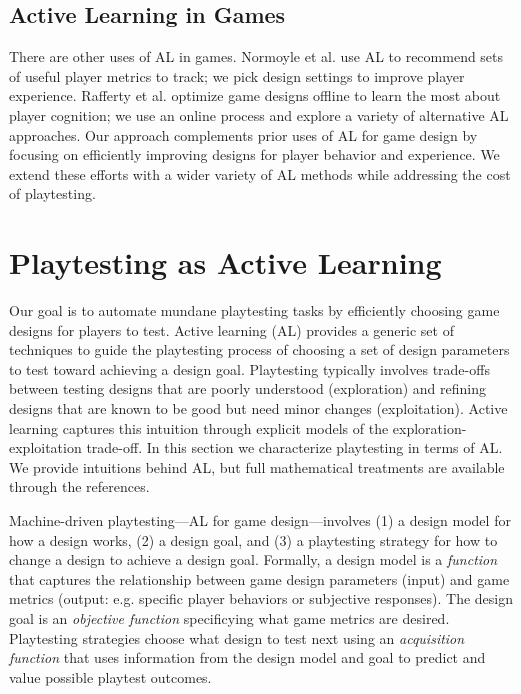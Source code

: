 \documentclass{sig-alternate}
\begin{document}
\subsection{Active Learning in Games}

There are other uses of AL in games.
Normoyle et al. \cite{normoyle2012:al-metrics} use AL to recommend sets of useful player metrics to track; we pick design settings to improve player experience.
Rafferty et al. \cite{rafferty2012:opt-cog-game} optimize game designs offline to learn the most about player cognition; we use an online process and explore a variety of alternative AL approaches.
Our approach complements prior uses of AL for game design by focusing on efficiently improving designs for player behavior and experience.
We extend these efforts with a wider variety of AL methods while addressing the cost of playtesting.



\section{Playtesting as Active Learning}

Our goal is to automate mundane playtesting tasks by efficiently choosing game designs for players to test.
Active learning (AL) provides a generic set of techniques to guide the playtesting process of choosing a set of design parameters to test toward achieving a design goal.
Playtesting typically involves trade-offs between testing designs that are poorly understood (exploration) and refining designs that are known to be good but need minor changes (exploitation).
Active learning captures this intuition through explicit models of the exploration-exploitation trade-off.
In this section we characterize playtesting in terms of AL.
We provide intuitions behind AL, but full mathematical treatments are available through the references.


Machine-driven playtesting---AL for game design---involves (1) a design model for how a design works, (2) a design goal, and (3) a playtesting strategy for how to change a design to achieve a design goal.
Formally, a design model is a \textit{function} that captures the relationship between game design parameters (input) and game metrics (output: e.g. specific player behaviors or subjective responses).
The design goal is an \textit{objective function} specificying what game metrics are desired.
Playtesting strategies choose what design to test next using an \textit{acquisition function} that uses information from the design model and goal to predict and value possible playtest outcomes.
\end{document}
